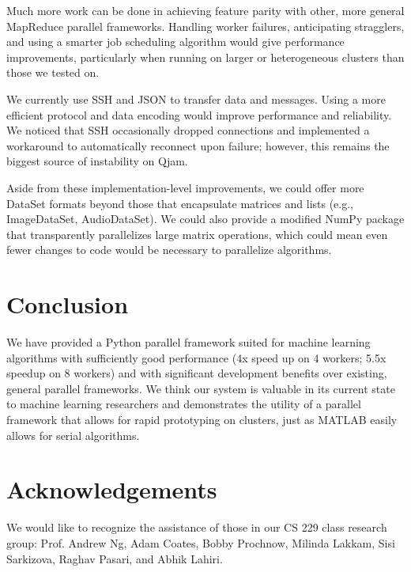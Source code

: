 \documentclass[%
  final,
  notitlepage,
  narroweqnarray,
  inline,
]{ieee}
\begin{document}
Much more work can be done in achieving feature parity with other, more general
MapReduce parallel frameworks. Handling worker failures, anticipating
stragglers, and using a smarter job scheduling algorithm would give performance
improvements, particularly when running on larger or heterogeneous clusters
than those we tested on.

We currently use SSH and JSON to transfer data and messages. Using a more
efficient protocol and data encoding would improve performance and
reliability. We noticed that SSH occasionally dropped connections and
implemented a workaround to automatically reconnect upon failure; however, this
remains the biggest source of instability on Qjam.

Aside from these implementation-level improvements, we could offer more DataSet
formats beyond those that encapsulate matrices and lists (e.g., ImageDataSet,
AudioDataSet). We could also provide a modified NumPy package that
transparently parallelizes large matrix operations, which could mean even fewer
changes to code would be necessary to parallelize algorithms.


\section{Conclusion}

We have provided a Python parallel framework suited for machine learning
algorithms with sufficiently good performance (4x speed up on 4 workers; 5.5x
speedup on 8 workers) and with significant development benefits over existing,
general parallel frameworks.  We think our system is valuable in its current
state to machine learning researchers and demonstrates the utility of a
parallel framework that allows for rapid prototyping on clusters, just as
MATLAB easily allows for serial algorithms.

\section{Acknowledgements}
We would like to recognize the assistance of those in our CS 229 class research
group: Prof. Andrew Ng, Adam Coates, Bobby Prochnow, Milinda Lakkam, Sisi
Sarkizova, Raghav Pasari, and Abhik Lahiri.




\end{document}
